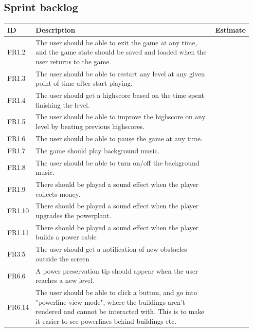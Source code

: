 \subsection{Sprint backlog}
	\begin{tabular}{| p{1.2cm} | p{8cm} | p{3cm} |}
		\hline
		\rowcolor{gray}
		ID & Description & Estimate \\ \hline
		FR1.2 &  The user should be able to exit the game at any time, and the game state should be saved and loaded when the user returns to the game. & \\ \hline

		FR1.3 & The user should be able to restart any level at any given point of time after start playing. & \\ \hline

		FR1.4 & The user should get a highscore based on the time spent finishing the level. & \\ \hline

		FR1.5 & The user should be able to improve the highscore on any level by beating previous highscores. & \\ \hline

		FR1.6 & The user should be able to pause the game at any time. & \\ \hline

		FR1.7 & The game should play background music. & \\ \hline

		FR1.8 & The user should be able to turn on/off the background music. & \\ \hline

		FR1.9 & There should be played a sound effect when the player collects money. & \\ \hline

		FR1.10 & There should be played a sound effect when the player upgrades the powerplant. & \\ \hline

		FR1.11 & There should be played a sound effect when the player builds a power cable & \\ \hline

		FR3.5 & The user should get a notification of new obstacles outside the screen & \\ \hline
		
		FR6.6 & A power preservation tip should appear when the user reaches a new level. & \\ \hline

		FR6.14 & The user should be able to click a button, and go into "powerline view mode", where the buildings aren't rendered and cannot be interacted with. This is to make it easier to see powerlines behind buildings etc. & \\ \hline
	\end{tabular}

